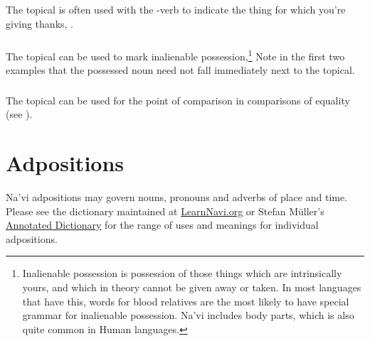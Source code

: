 \subsubsection{} The topical is often used with the -verb
  to indicate the thing for which you're
giving thanks, 
.

\subsubsection{} The topical can be used to mark inalienable
possession,\footnote{Inalienable possession is possession of those
things which are intrinsically yours, and which in theory cannot be
given away or taken.  In most languages that have this, words for blood
relatives are the most likely to have special grammar for
inalienable possession.  Na'vi includes body parts, which is also
quite common in Human languages.}  
     Note in the first two examples that
the possessed noun need not fall immediately next to the topical.
\label{syn:topical:poss}

\subsubsection{} The topical can be used for the point of comparison
in comparisons of equality (see ).


\section{Adpositions}
\noindent Na'vi adpositions may govern nouns, pronouns and adverbs
of place and time.  Please see the dictionary maintained at
\href{https://learnnavi.org/navi-vocabulary/}{LearnNavi.org} or Stefan
Müller's 
\href{https://forum.learnnavi.org/projects/an-annotated-dictionary-(draft)/}{Annotated Dictionary}
for the range of uses and meanings for individual adpositions.

